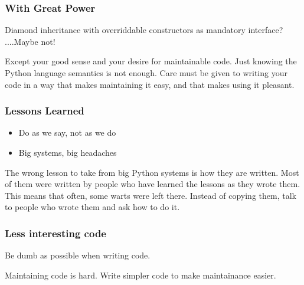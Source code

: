 \begin{frame}[fragile]
\frametitle{With Great Power}

Diamond inheritance with overriddable constructors as mandatory interface?
....Maybe not!
\end{frame}

Except your good sense and your desire for maintainable code.
Just knowing the Python language semantics is not enough.
Care must be given to writing your code in a way that makes maintaining
it easy,
and that makes using it pleasant.

\begin{frame}[fragile]
\frametitle{Lessons Learned}

\begin{itemize}
\item Do as we say, not as we do
\item Big systems, big headaches
\end{itemize}

\end{frame}

The wrong lesson to take from big Python systems is how they are written.
Most of them were written by people who have learned the lessons
as they wrote them.
This means that often,
some warts were left there.
Instead of copying them,
talk to people who wrote them and ask how to do it.

\begin{frame}[fragile]
\frametitle{Less interesting code}

Be dumb as possible when writing code.

\end{frame}

Maintaining code is hard.
Write simpler code to make maintainance easier.


